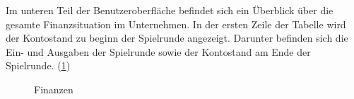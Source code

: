 Im unteren Teil der Benutzeroberfläche befindet sich ein Überblick über die gesamte Finanzsituation im Unternehmen. In der ersten Zeile der Tabelle wird der Kontostand zu beginn der Spielrunde angezeigt. Darunter befinden sich die Ein- und Ausgaben der Spielrunde sowie der Kontostand am Ende der Spielrunde. (\ref{img:ui-bank})

\begin{figure}[htb]
  \centering
  \caption{Finanzen}
  \label{img:ui-bank}
\end{figure}


\autorende{}
